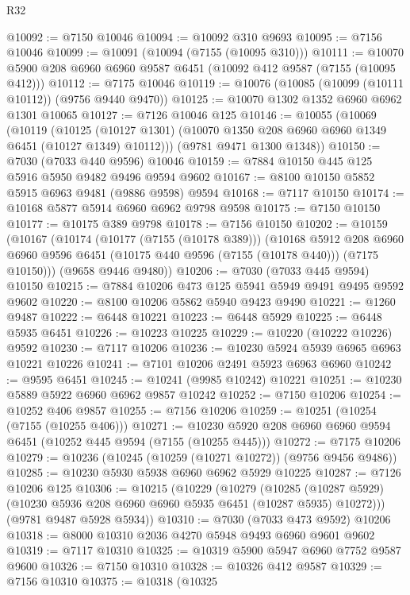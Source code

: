 \begin{lexlean}{R32}
\begin{coremodule}
@10092 := @7150 @10046
@10094 := @10092 @310 @9693
@10095 := @7156 @10046
@10099 := @10091 (@10094 (@7155 (@10095 @310)))
@10111 := @10070 @5900 @208 @6960 @6960 @9587 @6451 (@10092 @412 @9587 (@7155 (@10095 @412)))
@10112 := @7175 @10046
@10119 := @10076 (@10085 (@10099 (@10111 @10112)) (@9756 @9440 @9470))
@10125 := @10070 @1302 @1352 @6960 @6962 @1301 @10065
@10127 := @7126 @10046 @125
@10146 := @10055
    (@10069
      (@10119
        (@10125 (@10127 @1301) (@10070 @1350 @208 @6960 @6960 @1349 @6451 (@10127 @1349) @10112)))
      (@9781 @9471 @1300 @1348))
@10150 := @7030 (@7033 @440 @9596) @10046
@10159 := @7884 @10150 @445 @125 @5916 @5950 @9482 @9496 @9594 @9602
@10167 := @8100 @10150 @5852 @5915 @6963 @9481 (@9886 @9598) @9594
@10168 := @7117 @10150
@10174 := @10168 @5877 @5914 @6960 @6962 @9798 @9598
@10175 := @7150 @10150
@10177 := @10175 @389 @9798
@10178 := @7156 @10150
@10202 := @10159
    (@10167
      (@10174
        (@10177 (@7155 (@10178 @389)))
        (@10168
          @5912
          @208
          @6960
          @6960
          @9596
          @6451
          (@10175 @440 @9596 (@7155 (@10178 @440)))
          (@7175 @10150)))
      (@9658 @9446 @9480))
@10206 := @7030 (@7033 @445 @9594) @10150
@10215 := @7884 @10206 @473 @125 @5941 @5949 @9491 @9495 @9592 @9602
@10220 := @8100 @10206 @5862 @5940 @9423 @9490
@10221 := @1260 @9487
@10222 := @6448 @10221
@10223 := @6448 @5929
@10225 := @6448 @5935 @6451
@10226 := @10223 @10225
@10229 := @10220 (@10222 @10226) @9592
@10230 := @7117 @10206
@10236 := @10230 @5924 @5939 @6965 @6963 @10221 @10226
@10241 := @7101 @10206 @2491 @5923 @6963 @6960
@10242 := @9595 @6451
@10245 := @10241 (@9985 @10242) @10221
@10251 := @10230 @5889 @5922 @6960 @6962 @9857 @10242
@10252 := @7150 @10206
@10254 := @10252 @406 @9857
@10255 := @7156 @10206
@10259 := @10251 (@10254 (@7155 (@10255 @406)))
@10271 := @10230 @5920 @208 @6960 @6960 @9594 @6451 (@10252 @445 @9594 (@7155 (@10255 @445)))
@10272 := @7175 @10206
@10279 := @10236 (@10245 (@10259 (@10271 @10272)) (@9756 @9456 @9486))
@10285 := @10230 @5930 @5938 @6960 @6962 @5929 @10225
@10287 := @7126 @10206 @125
@10306 := @10215
    (@10229
      (@10279
        (@10285 (@10287 @5929) (@10230 @5936 @208 @6960 @6960 @5935 @6451 (@10287 @5935) @10272)))
      (@9781 @9487 @5928 @5934))
@10310 := @7030 (@7033 @473 @9592) @10206
@10318 := @8000 @10310 @2036 @4270 @5948 @9493 @6960 @9601 @9602
@10319 := @7117 @10310
@10325 := @10319 @5900 @5947 @6960 @7752 @9587 @9600
@10326 := @7150 @10310
@10328 := @10326 @412 @9587
@10329 := @7156 @10310
@10375 := @10318
    (@10325

\end{coremodule}
\end{lexlean}
